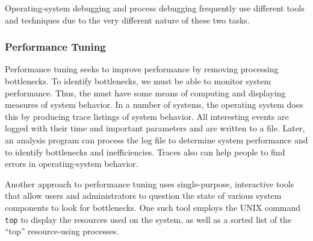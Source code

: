 Operating-system debugging and process debugging frequently use different tools and techniques due to the very different nature of these two tasks.

\subsubsection{Performance Tuning}\label{subsec:Performance_Tuning}
Performance tuning seeks to improve performance by removing processing bottlenecks.
To identify bottlenecks, we must be able to monitor system performance.
Thus, the  must have some means of computing and displaying measures of system behavior.
In a number of systems, the operating system does this by producing trace listings of system behavior.
All interesting events are logged with their time and important parameters and are written to a file.
Later, an analysis program can process the log file to determine system performance and to identify bottlenecks and inefficiencies.
Traces also can help people to find errors in operating-system behavior.

Another approach to performance tuning uses single-purpose, interactive tools that allow users and administrators to question the state of various system components to look for bottlenecks.
One such tool employs the UNIX command \texttt{top} to display the resources used on the system, as well as a sorted list of the ``top'' resource-using processes.

